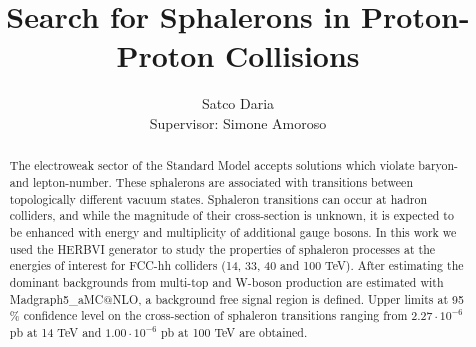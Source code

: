\documentclass[a4paper,12pt]{article}         %
\begin{document}
\title{Search for Sphalerons in Proton-Proton Collisions}

\author{Satco Daria \\
Supervisor: Simone Amoroso \\
}

\date{}

\maketitle

\begin{abstract}
The electroweak sector of the Standard Model accepts solutions which violate baryon- and lepton-number. These sphalerons are associated  with transitions between topologically different vacuum states. Sphaleron transitions can occur at hadron colliders,  and while the magnitude of their cross-section is unknown, it is expected to be enhanced with energy and multiplicity of additional gauge bosons.
In this work we used the HERBVI generator to study the properties of sphaleron processes  at  the energies of interest for  FCC-hh colliders (14, 33, 40 and 100 TeV).  After estimating the dominant backgrounds from multi-top and W-boson production are estimated with Madgraph5\_aMC$@$NLO, a background free signal region is defined.  Upper limits at 95 \%  confidence level on the cross-section of sphaleron transitions ranging from  $2.27 \cdot 10^{-6}$ pb at 14 TeV and $1.00 \cdot 10^{-6}$ pb at 100 TeV are obtained.
\end{abstract}
\end{document}
